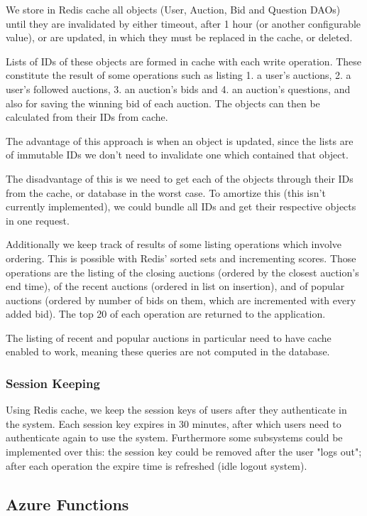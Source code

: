 \documentclass[runningheads]{llncs}
\begin{document}
We store in Redis cache all objects (User, Auction, Bid and Question DAOs) until they are invalidated by either timeout, after 1 hour (or another configurable value), or are updated, in which they must be replaced in the cache, or deleted. 

Lists of IDs of these objects are formed in cache with each write operation. These constitute the result of some operations such as listing 1. a user's auctions, 2. a user's followed auctions, 3. an auction's bids and 4. an auction's questions, and also for saving the winning bid of each auction. The objects can then be calculated from their IDs from cache. 

The advantage of this approach is when an object is updated, since the lists are of immutable IDs we don't need to invalidate one which contained that object. 

The disadvantage of this is we need to get each of the objects through their IDs from the cache, or database in the worst case. To amortize this (this isn't currently implemented), we could bundle all IDs and get their respective objects in one request.

Additionally we keep track of results of some listing operations which involve ordering. This is possible with Redis' sorted sets and incrementing scores. Those operations are the listing of the closing auctions (ordered by the closest auction's end time), of the recent auctions (ordered in list on insertion), and of popular auctions (ordered by number of bids on them, which are incremented with every added bid). The top 20 of each operation are returned to the application.

The listing of recent and popular auctions in particular need to have cache enabled to work, meaning these queries are not computed in the database.


\subsubsection{Session Keeping}

Using Redis cache, we keep the session keys of users after they authenticate in the system. Each session key expires in 30 minutes, after which users need to authenticate again to use the system. Furthermore some subsystems could be implemented over this: the session key could be removed after the user "logs out"; after each operation the expire time is refreshed (idle logout system).


\subsection{Azure Functions}
\end{document}
